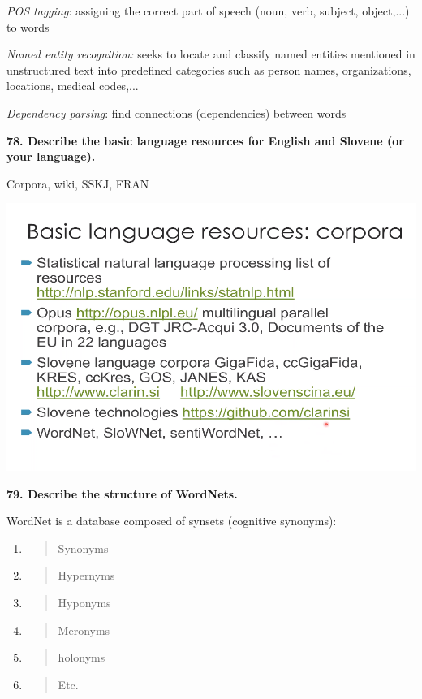 \textit{POS tagging}: assigning the correct part of speech (noun,
verb, subject, object,...) to words

\textit{Named entity recognition:} seeks to locate and classify named
entities mentioned in unstructured text into predefined categories such
as person names, organizations, locations, medical codes,...

\textit{Dependency parsing}: find connections (dependencies) between
words

\textbf{78. Describe the basic language resources for English and
Slovene (or your language).}

Corpora, wiki, SSKJ, FRAN

\includegraphics[width=\columnwidth]{media/image16.png}

\textbf{79. Describe the structure of WordNets.}

WordNet is a database composed of synsets (cognitive synonyms):

\begin{enumerate}
\def\labelenumi{\arabic{enumi}.}
\item
  \begin{quote}
  Synonyms
  \end{quote}
\item
  \begin{quote}
  Hypernyms
  \end{quote}
\item
  \begin{quote}
  Hyponyms
  \end{quote}
\item
  \begin{quote}
  Meronyms
  \end{quote}
\item
  \begin{quote}
  holonyms
  \end{quote}
\item
  \begin{quote}
  Etc.
  \end{quote}
\end{enumerate}

